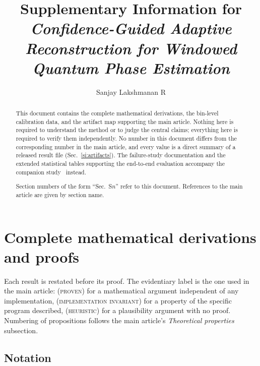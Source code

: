 \documentclass[final,5p,times,longtitle]{elsarticle}
\theoremstyle{plain}
\newcommand{\PROVEN}{\textsc{(proven)}}
\newcommand{\HEUR}{\textsc{(heuristic)}}
\newcommand{\INVAR}{\textsc{(implementation invariant)}}
\begin{document}
\begin{frontmatter}
\title{Supplementary Information for\\
\emph{Confidence-Guided Adaptive Reconstruction for Windowed Quantum
Phase Estimation}}
\author[inst1]{Sanjay Lakshmanan R}
\address[inst1]{Department of Computer Science and Engineering,
Amrita Vishwa Vidyapeetham, Chennai, India}

\begin{abstract}
This document contains the complete mathematical derivations, the
bin-level calibration data, and the artifact map supporting the main
article. Nothing here is required to understand the method or to judge
the central claims; everything here is required to verify them
independently. No number in this document differs from the corresponding
number in the main article, and every value is a direct summary of a
released result file (Sec.~\ref{si:artifacts}). The failure-study
documentation and the extended statistical tables supporting the
end-to-end evaluation accompany the companion study~\cite{companion}
instead.

Section numbers of the form ``Sec.~S$n$'' refer to this document.
References to the main article are given by section name.
\end{abstract}
\end{frontmatter}

\tableofcontents
\vspace{1em}
\section{Complete mathematical derivations and proofs}
\label{si:proofs}

Each result is restated before its proof. The evidentiary label is the
one used in the main article: \PROVEN{} for a mathematical argument
independent of any implementation, \INVAR{} for a property of the
specific program described, \HEUR{} for a plausibility argument with no
proof. Numbering of propositions follows the main article's
\emph{Theoretical properties} subsection.

\subsection{Notation}
\end{document}
